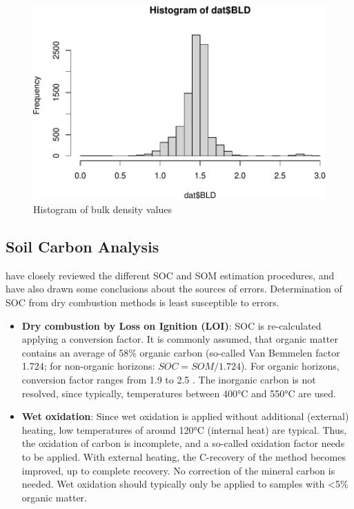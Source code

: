 \documentclass[10pt,b5paper,]{book}
\theoremstyle{definition}
\theoremstyle{definition}
\theoremstyle{definition}
\theoremstyle{remark}
\begin{document}
\begin{figure}
\centering
\includegraphics{SOCMapping_files/figure-latex/unnamed-chunk-12-1.pdf}
\caption{\label{fig:unnamed-chunk-12}Histogram of bulk density values}
\end{figure}

\hypertarget{soil-carbon-analysis}{%
\subsection{Soil Carbon Analysis}\label{soil-carbon-analysis}}

\cite{rosell2001soil} have closely reviewed the different SOC and SOM
estimation procedures, and have also drawn some conclusions about the
sources of errors. Determination of SOC from dry combustion methods is
least susceptible to errors.

\begin{itemize}
\item
  \textbf{Dry combustion by Loss on Ignition (LOI)}: SOC is
  re-calculated applying a conversion factor. It is commonly assumed,
  that organic matter contains an average of 58\% organic carbon
  (so-called Van Bemmelen factor 1.724; for non-organic horizons:
  \(SOC = SOM / 1.724\)). For organic horizons, conversion factor ranges
  from 1.9 to 2.5 \citep{nelson1982total}. The inorganic carbon is not
  resolved, since typically, temperatures between 400°C and 550°C are
  used.
\item
  \textbf{Wet oxidation}: Since wet oxidation is applied without
  additional (external) heating, low temperatures of around 120°C
  (internal heat) are typical. Thus, the oxidation of carbon is
  incomplete, and a so-called oxidation factor needs to be applied. With
  external heating, the C-recovery of the method becomes improved, up to
  complete recovery. No correction of the mineral carbon is needed. Wet
  oxidation should typically only be applied to samples with
  \textless{}5\% organic matter.
\end{itemize}
\end{document}
